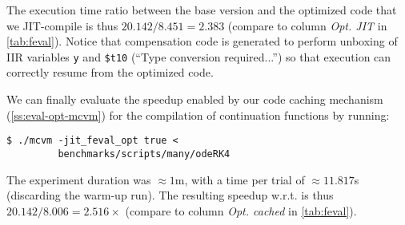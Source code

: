 \noindent The execution time ratio between the base version and the optimized code that we JIT-compile is thus $20.142/8.451=2.383$ (compare to column {\em Opt. JIT} in \mytable\ref{tab:feval}). Notice that compensation code is generated to perform unboxing of IIR variables {\tt y} and {\tt \$t10} (``Type conversion required...'') so that execution can correctly resume from the optimized code.

We can finally evaluate the speedup enabled by our code caching mechanism (\mysection\ref{ss:eval-opt-mcvm}) for the compilation of continuation functions by running:
\begin{small}
\begin{verbatim}
$ ./mcvm -jit_feval_opt true <
         benchmarks/scripts/many/odeRK4
\end{verbatim}
\end{small}

\noindent The experiment duration was $\approx1$m, with a time per trial of $\approx11.817$s (discarding the warm-up run). The resulting speedup w.r.t. is thus $20.142/8.006=2.516\times$ (compare to column {\em Opt. cached} in \mytable\ref{tab:feval}).

